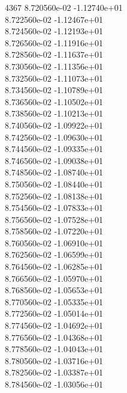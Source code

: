 4367	8.720560e-02	-1.12740e+01	\\ 	8.722560e-02	-1.12467e+01	\\ 	8.724560e-02	-1.12193e+01	\\ 	8.726560e-02	-1.11916e+01	\\ 	8.728560e-02	-1.11637e+01	\\ 	8.730560e-02	-1.11356e+01	\\ 	8.732560e-02	-1.11073e+01	\\ 	8.734560e-02	-1.10789e+01	\\ 	8.736560e-02	-1.10502e+01	\\ 	8.738560e-02	-1.10213e+01	\\ 	8.740560e-02	-1.09922e+01	\\ 	8.742560e-02	-1.09630e+01	\\ 	8.744560e-02	-1.09335e+01	\\ 	8.746560e-02	-1.09038e+01	\\ 	8.748560e-02	-1.08740e+01	\\ 	8.750560e-02	-1.08440e+01	\\ 	8.752560e-02	-1.08138e+01	\\ 	8.754560e-02	-1.07833e+01	\\ 	8.756560e-02	-1.07528e+01	\\ 	8.758560e-02	-1.07220e+01	\\ 	8.760560e-02	-1.06910e+01	\\ 	8.762560e-02	-1.06599e+01	\\ 	8.764560e-02	-1.06285e+01	\\ 	8.766560e-02	-1.05970e+01	\\ 	8.768560e-02	-1.05653e+01	\\ 	8.770560e-02	-1.05335e+01	\\ 	8.772560e-02	-1.05014e+01	\\ 	8.774560e-02	-1.04692e+01	\\ 	8.776560e-02	-1.04368e+01	\\ 	8.778560e-02	-1.04043e+01	\\ 	8.780560e-02	-1.03716e+01	\\ 	8.782560e-02	-1.03387e+01	\\ 	8.784560e-02	-1.03056e+01	\\ \hline
